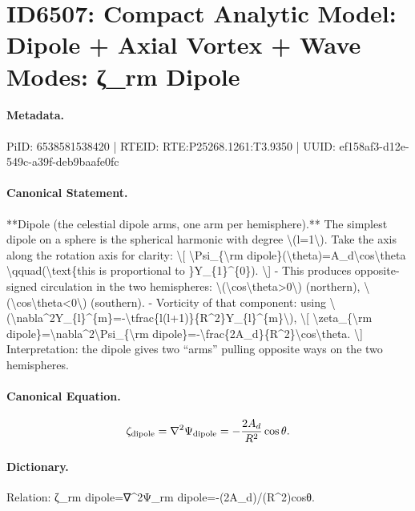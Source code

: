 \section*{ID6507: Compact Analytic Model: Dipole + Axial Vortex + Wave Modes: ζ\_rm Dipole}
\paragraph{Metadata.}
PiID: 6538581538420 | RTEID: RTE:P25268.1261:T3.9350 | UUID: ef158af3-d12e-549c-a39f-deb9baafe0fc

\paragraph{Canonical Statement.}
**Dipole (the celestial dipole arms, one arm per hemisphere).** The simplest dipole on a sphere is the spherical harmonic with degree \textbackslash{}(l=1\textbackslash{}). Take the axis along the rotation axis for clarity: \textbackslash{}[ \textbackslash{}Psi\_\{\textbackslash{}rm dipole\}(\textbackslash{}theta)=A\_d\textbackslash{}cos\textbackslash{}theta \textbackslash{}qquad(\textbackslash{}text\{this is proportional to \}Y\_\{1\}\textasciicircum{}\{0\}). \textbackslash{}] - This produces opposite-signed circulation in the two hemispheres: \textbackslash{}(\textbackslash{}cos\textbackslash{}theta>0\textbackslash{}) (northern), \textbackslash{}(\textbackslash{}cos\textbackslash{}theta<0\textbackslash{}) (southern). - Vorticity of that component: using \textbackslash{}(\textbackslash{}nabla\textasciicircum{}2Y\_\{l\}\textasciicircum{}\{m\}=-\textbackslash{}tfrac\{l(l+1)\}\{R\textasciicircum{}2\}Y\_\{l\}\textasciicircum{}\{m\}\textbackslash{}), \textbackslash{}[ \textbackslash{}zeta\_\{\textbackslash{}rm dipole\}=\textbackslash{}nabla\textasciicircum{}2\textbackslash{}Psi\_\{\textbackslash{}rm dipole\}=-\textbackslash{}frac\{2A\_d\}\{R\textasciicircum{}2\}\textbackslash{}cos\textbackslash{}theta. \textbackslash{}] Interpretation: the dipole gives two “arms” pulling opposite ways on the two hemispheres.

\paragraph{Canonical Equation.}
\[
\zeta_{\rm dipole}=\nabla^2\Psi_{\rm dipole}=-\frac{2A_d}{R^2}\cos\theta.
\]

\paragraph{Dictionary.}
Relation: ζ\_rm dipole=∇\textasciicircum{}2Ψ\_rm dipole=-(2A\_d)/(R\textasciicircum{}2)cosθ.

